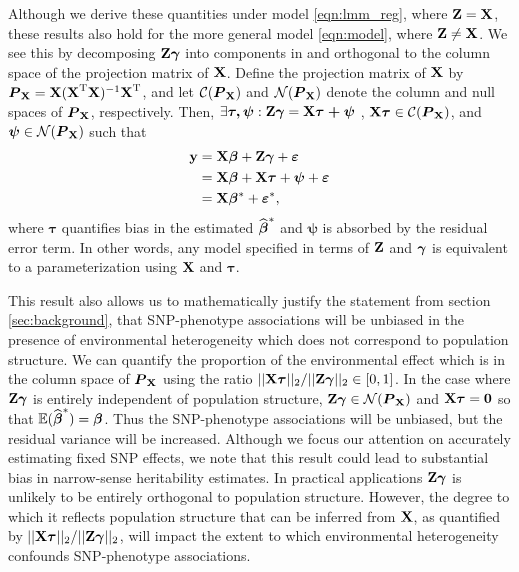 Although we derive these quantities under model \eqref{eqn:lmm_reg}, where $\textbf{Z} = \textbf{X}$, these results also hold for the more general model \eqref{eqn:model}, where $\textbf{Z} \ne \textbf{X}$. We see this by decomposing $\textbf{Z} \boldsymbol{\gamma}$ into components in and orthogonal to the column space of the projection matrix of $\textbf{X}$. Define the projection matrix of $\textbf{X}$ by $\boldsymbol{P}_{\textbf{X}} = \textbf{X} (\textbf{X}^{\text{T}} \textbf{X})^{-1} \textbf{X}^{\text{T}}$, and let $\mathcal{C}(\boldsymbol{P}_{\textbf{X}})$ and $\mathcal{N}(\boldsymbol{P}_{\textbf{X}})$ denote the column and null spaces of $\boldsymbol{P}_{\textbf{X}}$, respectively. Then, $\exists \boldsymbol{\tau, \psi}: \textbf{Z} \boldsymbol{\gamma} = \textbf{X} \boldsymbol{\tau + \psi}$ , $\textbf{X} \boldsymbol{\tau} \in \mathcal{C}(\boldsymbol{P}_{\textbf{X}})$, and $\boldsymbol{\psi} \in \mathcal{N}(\boldsymbol{P}_{\textbf{X}})$ such that
\begin{align*}
    \textbf{y} &= \textbf{X}\boldsymbol{\beta}{} + \textbf{Z}\boldsymbol{\gamma} + \boldsymbol{\varepsilon}{}\\
    &= \textbf{X}\boldsymbol{\beta}{} + \textbf{X} \boldsymbol{\tau} + \boldsymbol{\psi} + \boldsymbol{\varepsilon}{}\\
    &=  \textbf{X} \boldsymbol{\beta}{}{^*} + \boldsymbol{\varepsilon}{}{^*},
\end{align*}
where $\boldsymbol{\tau}$ quantifies bias in the estimated $\widehat{\boldsymbol{\beta}{}}^*$ and $\boldsymbol{\psi}$ is absorbed by the residual error term. In other words, any model specified in terms of $\textbf{Z}$ and $\boldsymbol{\gamma}$ is equivalent to a parameterization using $\textbf{X}$ and $\boldsymbol{\tau}$.

This result also allows us to mathematically justify the statement from section \ref{sec:background}, that SNP-phenotype associations will be unbiased in the presence of environmental heterogeneity which does not correspond to population structure. We can quantify the proportion of the environmental effect which is in the column space of $\boldsymbol{P}_{\textbf{X}}$ using the ratio $||\textbf{X} \boldsymbol{\tau}||_2 / ||\textbf{Z} \boldsymbol{\gamma}||_2 \in [0, 1]$. In the case where $\textbf{Z} \boldsymbol{\gamma}$ is entirely independent of population structure, $\textbf{Z} \boldsymbol{\gamma} \in \mathcal{N}(\boldsymbol{P}_{\textbf{X}})$ and $\textbf{X} \boldsymbol{\tau} = \boldsymbol{0}$ so that $\mathbb{E}(\widehat{\boldsymbol{\beta}{}}^*) = \boldsymbol{\beta}{}$. Thus the SNP-phenotype associations will be unbiased, but the residual variance will be increased. Although we focus our attention on accurately estimating fixed SNP effects, we note that this result could lead to substantial bias in narrow-sense heritability estimates. In practical applications $\textbf{Z} \boldsymbol{\gamma}$ is unlikely to be entirely orthogonal to population structure. However, the degree to which it reflects population structure that can be inferred from $\textbf{X}$, as quantified by $||\textbf{X} \boldsymbol{\tau}||_2 / ||\textbf{Z} \boldsymbol{\gamma}||_2$, will impact the extent to which environmental heterogeneity confounds SNP-phenotype associations. 

